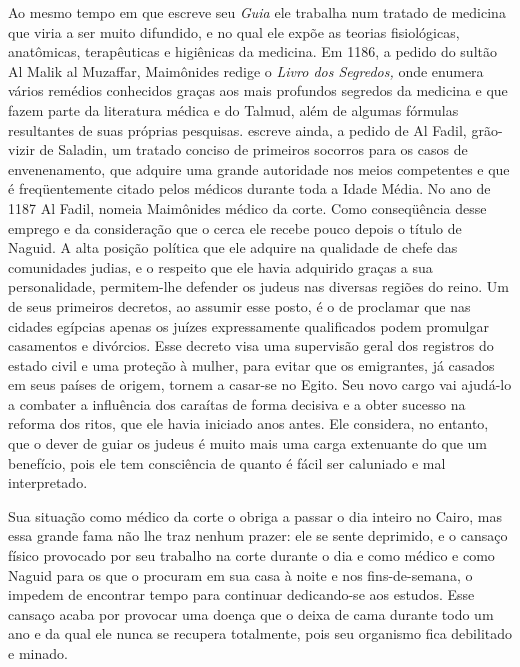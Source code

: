 Ao mesmo tempo em que escreve seu \emph{Guia} ele trabalha num trata­do
de medicina que viria a ser muito difundido, e no qual ele expõe as
teorias fisiológicas, anatômicas, terapêuticas e higiênicas da medicina.
Em 1186, a pe­dido do sultão Al Malik al Muzaffar, Maimônides redige o
\emph{Livro dos Segredos,} onde enumera vários remédios conhecidos
graças aos mais profundos segre­dos da medicina e que fazem parte da
literatura médica e do Talmud, além de algumas fórmulas resultantes de
suas próprias pesquisas. escreve ainda, a pedi­do de Al Fadil,
grão-vizir de Saladin, um tratado conciso de primeiros socorros para os
casos de envenenamento, que adquire uma grande autoridade nos meios
competentes e que é freqüentemente citado pelos médicos durante toda a
Ida­de Média.
No ano de 1187 Al Fadil, nomeia Maimônides médico da corte. Co­mo
conseqüência desse emprego e da consideração que o cerca ele recebe
pouco depois o título de Naguid. A alta posição política que ele adquire
na qualidade de chefe das comunidades judias, e o respeito que ele havia
adquirido graças a sua personalidade, permitem-lhe defender os judeus
nas diversas regiões do reino. Um de seus primeiros decretos, ao assumir
esse posto, é o de proclamar que nas cidades egípcias apenas os juízes
expressamente qualificados podem promulgar casamentos e divórcios. Esse
decreto visa uma supervisão geral dos registros do estado civil e uma
proteção à mulher, para evitar que os emigran­tes, já casados em seus
países de origem, tornem a casar-se no Egito. Seu novo cargo vai
ajudá-lo a combater a influência dos caraítas de forma decisiva e a
obter sucesso na reforma dos ritos, que ele havia iniciado anos antes.
Ele consi­dera, no entanto, que o dever de guiar os judeus é muito mais
uma carga exte­nuante do que um benefício, pois ele tem consciência de
quanto é fácil ser ca­luniado e mal interpretado.

Sua situação como médico da corte o obriga a passar o dia inteiro no
Cairo, mas essa grande fama não lhe traz nenhum prazer: ele se sente
depri­mido, e o cansaço físico provocado por seu trabalho na corte
durante o dia e como médico e como Naguid para os que o procuram em sua
casa à noite e nos fins-de-semana, o impedem de encontrar tempo para
continuar dedican­do-se aos estudos. Esse cansaço acaba por provocar uma
doença que o deixa de cama durante todo um ano e da qual ele nunca se
recupera totalmente, pois seu organismo fica debilitado e minado.

